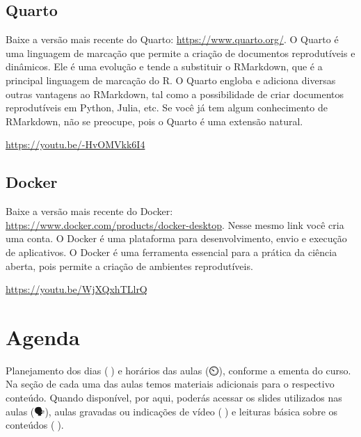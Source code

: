 \documentclass[
  a4paper,
]{article}
\begin{document}
\subsection*{Quarto}\label{sec-quartoprework}


Baixe a versão mais recente do Quarto: \url{https://www.quarto.org/}. O
Quarto é uma linguagem de marcação que permite a criação de documentos
reprodutíveis e dinâmicos. Ele é uma evolução e tende a substituir o
RMarkdown, que é a principal linguagem de marcação do R. O Quarto
engloba e adiciona diversas outras vantagens ao RMarkdown, tal como a
possibilidade de criar documentos reprodutíveis em Python, Julia, etc.
Se você já tem algum conhecimento de RMarkdown, não se preocupe, pois o
Quarto é uma extensão natural.

\url{https://youtu.be/-HvOMVkk6I4}

\subsection*{Docker}\label{sec-dockerprework}


Baixe a versão mais recente do Docker:
\url{https://www.docker.com/products/docker-desktop}. Nesse mesmo link
você cria uma conta. O Docker é uma plataforma para desenvolvimento,
envio e execução de aplicativos. O Docker é uma ferramenta essencial
para a prática da ciência aberta, pois permite a criação de ambientes
reprodutíveis.

\url{https://youtu.be/WjXQxhTLlrQ}


\section*{Agenda 📅}\label{sec-schedule}


Planejamento dos dias (📅) e horários das aulas (⏲️), conforme a ementa
do curso. Na seção de cada uma das aulas temos materiais adicionais para
o respectivo conteúdo. Quando disponível, por aqui, poderás acessar os
slides utilizados nas aulas (🗣️), aulas gravadas ou indicações de vídeo
(🎥) e leituras básica sobre os conteúdos (📓).
\end{document}
